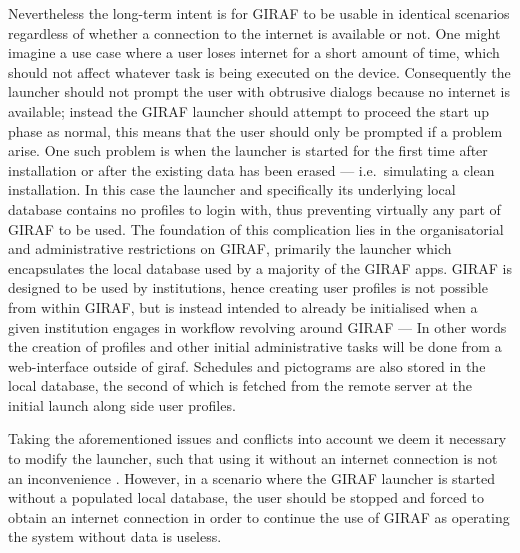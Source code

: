 Nevertheless the long-term intent is for GIRAF to be usable in identical scenarios regardless of whether a connection to the internet is available or not.
One might imagine a use case where a user loses internet for a short amount of time, which should not affect whatever task is being executed on the device. 
Consequently the launcher should not prompt the user with obtrusive dialogs because no internet is available; instead the GIRAF launcher should attempt to proceed the start up phase as normal, this means that the user should only be prompted if a problem arise.
One such problem is when the launcher is started for the first time after installation or after the existing data has been erased --- i.e.\ simulating a clean installation. 
In this case the launcher and specifically its underlying local database contains no profiles to login with, thus preventing virtually any part of GIRAF to be used. 
The foundation of this complication lies in the organisatorial and administrative restrictions on GIRAF, primarily the launcher which encapsulates the local database used by a majority of the GIRAF apps.
GIRAF is designed to be used by institutions, hence creating user profiles is not possible from within GIRAF, but is instead intended to already be initialised when a given institution engages in workflow revolving around GIRAF --- In other words the creation of profiles and other initial administrative tasks will be done from a web-interface outside of giraf.
Schedules and pictograms are also stored in the local database, the second of which is fetched from the remote server at the initial launch along side user profiles.

\bigskip \noindent
Taking the aforementioned issues and conflicts into account we deem it necessary to modify the launcher, such that using it without an internet connection is not an inconvenience .
However, in a scenario where the GIRAF launcher is started without a populated local database, the user should be stopped and forced to obtain an internet connection in order to continue the use of GIRAF as operating the system without data is useless. 

